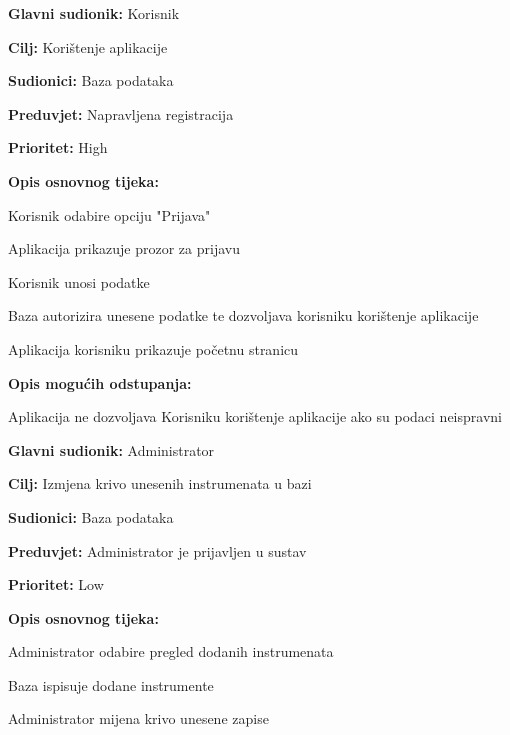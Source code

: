 \noindent {}
	\begin{packed_item}
	
		\item \textbf{Glavni sudionik: } Korisnik
		\item  \textbf{Cilj:} Korištenje aplikacije
		\item  \textbf{Sudionici:} Baza podataka
		\item  \textbf{Preduvjet:} Napravljena registracija
		\item  \textbf{Prioritet:} High
		\item  \textbf{Opis osnovnog tijeka:}
		
		\item[] \begin{packed_enum}
			
			\item Korisnik odabire opciju "Prijava"
			\item Aplikacija prikazuje prozor za prijavu
			\item Korisnik unosi podatke
			\item Baza autorizira unesene podatke te dozvoljava korisniku korištenje aplikacije
			\item Aplikacija korisniku prikazuje početnu stranicu
		\end{packed_enum}
	
			\item  \textbf{Opis mogućih odstupanja:}
			\item[] \begin{packed_enum}
												
				\item[2.a] Aplikacija ne dozvoljava Korisniku korištenje aplikacije ako su podaci neispravni
				
			\end{packed_enum}
	\end{packed_item}


\noindent {}
	\begin{packed_item}

		\item \textbf{Glavni sudionik:} Administrator
		\item \textbf{Cilj:} Izmjena krivo unesenih instrumenata u bazi
		\item \textbf{Sudionici:} Baza podataka
		\item \textbf{Preduvjet:} Administrator je prijavljen u sustav
		\item \textbf{Prioritet:} Low
		\item \textbf{Opis osnovnog tijeka:}
		
		\item[] \begin{packed_enum}

			\item Administrator odabire pregled dodanih instrumenata
			\item Baza ispisuje dodane instrumente
			\item Administrator mijena krivo unesene zapise 
		\end{packed_enum}
	\end{packed_item}
			
